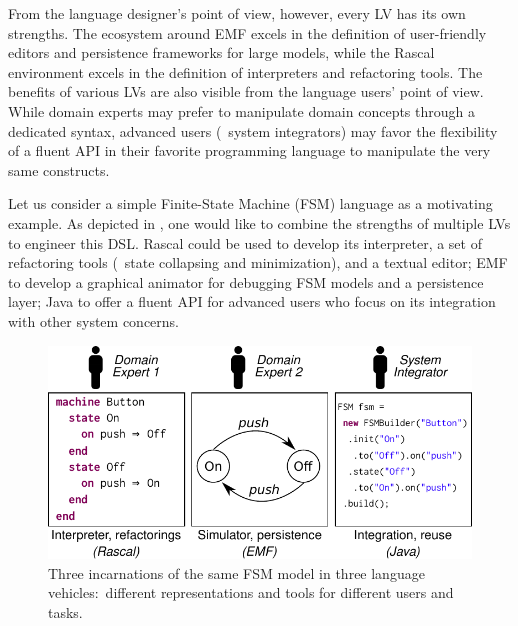 From the language designer's point of view, however, every LV has its own strengths.
The ecosystem around EMF excels in the definition of user-friendly editors and persistence frameworks for large models, while the Rascal environment excels in the definition of interpreters and refactoring tools.
The benefits of various LVs are also visible from the language users' point of view.
While domain experts may prefer to manipulate domain concepts through a dedicated syntax, advanced users (\eg~system integrators) may favor the flexibility of a fluent API in their favorite programming language to manipulate the very same constructs.

Let us consider a simple Finite-State Machine (FSM) language as a motivating example.
As depicted in , one would like to combine the strengths of multiple LVs to engineer this DSL.
Rascal could be used to develop its interpreter, a set of refactoring tools (\eg~state collapsing and minimization), and a textual editor; EMF to develop a graphical animator for debugging FSM models and a persistence layer; Java to offer a fluent API for advanced users who focus on its integration with other system concerns.

\begin{figure}[bt]
	\centering
	\includegraphics[width=\columnwidth]{figures/motivating-fsm-simplified-2}
	\caption{Three incarnations of the same FSM model in three language vehicles:~different representations and tools for different users and tasks.}
	\label{fig:motivating-fsm}
\end{figure}

